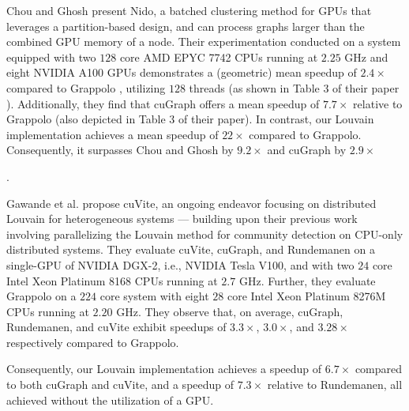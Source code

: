Chou and Ghosh \cite{chou2022batched} present Nido, a batched clustering method for GPUs that leverages a partition-based design, and can process graphs larger than the combined GPU memory of a node. Their experimentation conducted on a system equipped with two $128$ core AMD EPYC 7742 CPUs running at $2.25$ GHz and eight NVIDIA A100 GPUs demonstrates a (geometric) mean speedup of $2.4\times$ compared to Grappolo \cite{com-halappanavar17}, utilizing $128$ threads (as shown in Table 3 of their paper \cite{chou2022batched}). Additionally, they find that cuGraph \cite{hricik2020using} offers a mean speedup of $7.7\times$ relative to Grappolo (also depicted in Table 3 of their paper). In contrast, our Louvain implementation achieves a mean speedup of $22\times$ compared to Grappolo. Consequently, it surpasses Chou and Ghosh by $9.2\times$ and cuGraph by $2.9\times$.

Gawande et al. \cite{com-gawande22} propose cuVite, an ongoing endeavor focusing on distributed Louvain for heterogeneous systems --- building upon their previous work involving parallelizing the Louvain method for community detection on CPU-only distributed systems. They evaluate cuVite, cuGraph, and Rundemanen on a single-GPU of NVIDIA DGX-2, i.e., NVIDIA Tesla V100, and with two $24$ core Intel Xeon Platinum 8168 CPUs running at $2.7$ GHz. Further, they evaluate Grappolo on a $224$ core system with eight $28$ core Intel Xeon Platinum 8276M CPUs running at $2.20$ GHz. They observe that, on average, cuGraph, Rundemanen, and cuVite exhibit speedups of $3.3\times$, $3.0\times$, and $3.28\times$ respectively compared to Grappolo.  Consequently, our Louvain implementation achieves a speedup of $6.7\times$ compared to both cuGraph and cuVite, and a speedup of $7.3\times$ relative to Rundemanen, all achieved without the utilization of a GPU.
